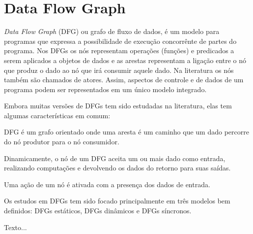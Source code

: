 
\chapter{Data Flow Graph}

\textit{Data Flow Graph} (DFG) ou grafo de fluxo de dados, é um modelo para 
programas que expressa a possibilidade de execução concorrênte de partes do
programa. 
Nos DFGs os nós representam operações (funções) e predicados a serem
aplicados a objetos de dados e as arestas representam a ligação entre o nó que
produz o dado ao nó que irá consumir aquele dado.
Na literatura os nós também são chamados de atores.
Assim, aspectos de controle e de dados de um programa podem ser representados 
em um único modelo integrado.

Embora muitas versões de DFGs tem sido estudadas na literatura, elas tem algumas
características em comum:

\begin{alineas}
        \item DFG é um grafo orientado onde uma aresta é um caminho que um dado
        percorre do nó produtor para o nó consumidor.
        \item Dinamicamente, o nó de um DFG aceita um ou mais dado como entrada,
        realizando computações e devolvendo os dados do retorno para suas
        saídas.
        \item Uma ação de um nó é ativada com a presença dos dados de entrada.
\end{alineas}

Os estudos em DFGs tem sido focado principalmente em três modelos bem definidos:
DFGs estáticos, DFGs dinâmicos e DFGs síncronos.



Texto...
